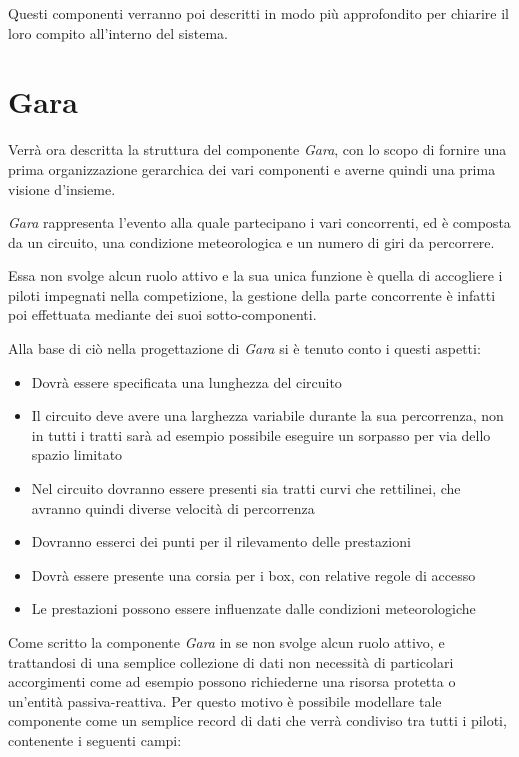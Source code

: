 \documentclass[a4paper,11pt, twoside, openright]{book}
\begin{document}
	Questi componenti verranno poi descritti in modo più approfondito per chiarire il loro compito all'interno del
	sistema.
	
    \section{Gara}
      Verrà ora descritta la struttura del componente \textsl{Gara}, con lo scopo di fornire una prima organizzazione gerarchica 
      dei vari componenti e averne quindi una prima visione d'insieme.
      
      \textsl{Gara} rappresenta l'evento alla quale partecipano i vari concorrenti, ed è composta
      da un circuito, una condizione meteorologica e un numero di giri da percorrere.
      
      Essa non svolge alcun ruolo attivo
      e la sua unica funzione è quella di accogliere i piloti impegnati nella competizione,
      la gestione della parte concorrente è infatti poi effettuata mediante dei suoi sotto-componenti. 
      
      Alla base di ciò nella progettazione di \textsl{Gara} si è tenuto conto i questi aspetti:
	
	\begin{itemize}
	  \item Dovrà essere specificata una lunghezza del circuito
	  \item Il circuito deve avere una larghezza variabile durante la sua percorrenza, non in tutti i tratti sarà
		ad esempio possibile eseguire un sorpasso per via dello spazio limitato
	  \item Nel circuito dovranno essere presenti sia tratti curvi che rettilinei, che avranno quindi diverse velocità
		di percorrenza
	  \item Dovranno esserci dei punti per il rilevamento delle prestazioni
	  \item Dovrà essere presente una corsia per i box, con relative regole di accesso
	  \item Le prestazioni possono essere influenzate dalle condizioni meteorologiche
	\end{itemize}
	
      Come scritto la componente \textsl{Gara} in se non svolge alcun ruolo attivo, e trattandosi di una semplice
      collezione di dati non necessità di particolari accorgimenti come ad esempio possono richiederne una risorsa protetta
      o un'entità passiva-reattiva. Per questo motivo è possibile modellare tale componente come un semplice record di dati 
      che verrà condiviso tra tutti i piloti, contenente i seguenti campi:
      
\end{document}

